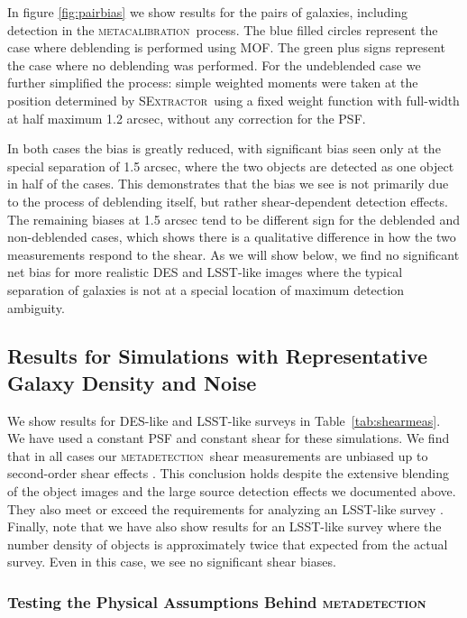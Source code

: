 \documentclass[fleqn,useAMS,usenatbib]{mnras}
\newcommand{\mcal}{\textsc{metacalibration}}
\newcommand{\mdet}{\textsc{metadetection}}
\newcommand{\sx}{\textsc{SExtractor}}
\begin{document}
In figure \ref{fig:pairbias} we show results for the pairs of galaxies, including
detection in the \mcal\ process. The blue filled circles represent the case
where deblending is performed using MOF. The green plus signs represent the
case where no deblending was performed. For the undeblended case we further
simplified the process: simple weighted moments were taken at the position
determined by \sx\ using a fixed weight function with full-width at half
maximum 1.2 arcsec, without any correction for the PSF.

In both cases the bias is greatly reduced, with significant bias seen only at
the special separation of 1.5 arcsec, where the two objects are detected as one
object in half of the cases. This demonstrates that the bias we see is not
primarily due to the process of deblending itself, but rather shear-dependent
detection effects. The remaining biases at 1.5 arcsec tend to be different sign
for the deblended and non-deblended cases, which shows there is a qualitative
difference in how the two measurements respond to the shear. As we will show
below, we find no significant net bias for more realistic DES and LSST-like
images where the typical separation of galaxies is not at a special location of
maximum detection ambiguity.

\subsection{Results for Simulations with Representative Galaxy Density and Noise}
\label{sec:res:constpsf}

We show results for DES-like and LSST-like surveys in Table~\ref{tab:shearmeas}.
We have used a constant PSF and constant shear for these simulations. We find
that in all cases our \mdet\ shear measurements are unbiased up to
second-order shear effects \citep[we expect a bias of a few parts in 10000 for shears
of 0.02, see][]{SheldonMcal2017}. This conclusion holds despite the extensive blending
of the object images and the large source detection effects we documented
above. They also meet or exceed the requirements for analyzing an LSST-like survey
\citep[e.g.,][]{huterer2006}. Finally, note that we have also show results for an
LSST-like survey where the number density of objects is approximately twice that
expected from the actual survey. Even in this case, we see no significant shear biases.

\subsubsection{Testing the Physical Assumptions Behind \mdet}
\end{document}
